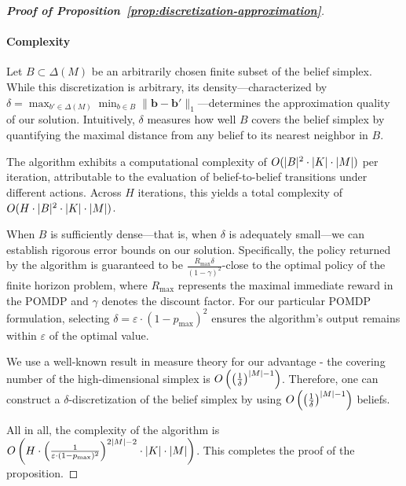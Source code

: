 \begin{proof}[\normalfont\bfseries Proof of Proposition~\ref{prop:discretization-approximation}]
    
    
  \paragraph{Complexity} Let $B \subset \Delta(M)$ be an arbitrarily chosen finite subset of the belief simplex. While this discretization is arbitrary, its density—characterized by $\delta = \max_{b' \in \Delta(M)} \min_{b \in B} \|\bm{b} - \bm{b}'\|_1$—determines the approximation quality of our solution. Intuitively, $\delta$ measures how well $B$ covers the belief simplex by quantifying the maximal distance from any belief to its nearest neighbor in $B$.

  The algorithm exhibits a computational complexity of $O(\lvert B\rvert^2 \cdot \lvert K\rvert \cdot \lvert M\rvert)$ per iteration, attributable to the evaluation of belief-to-belief transitions under different actions. Across $H$ iterations, this yields a total complexity of $O(H \cdot \lvert B\rvert^2 \cdot \lvert K\rvert \cdot \lvert M\rvert)$.

  When $B$ is sufficiently dense—that is, when $\delta$ is adequately small—we can establish rigorous error bounds on our solution. Specifically, the policy returned by the algorithm is guaranteed to be $\frac{R_{\max} \delta}{(1 - \gamma)^2}$-close to the optimal policy of the finite horizon problem, where $R_{\max}$ represents the maximal immediate reward in the POMDP and $\gamma$ denotes the discount factor. For our particular POMDP formulation, selecting $\delta = \varepsilon \cdot (1 - p_{\max})^2$ ensures the algorithm's output remains within $\varepsilon$ of the optimal value.

  We use a well-known result in measure theory for our advantage - the covering number of the high-dimensional simplex is $O\left( \left( \frac{1}{\delta} \right)^{\lvert M\rvert - 1} \right)$. Therefore, one can construct a $\delta$-discretization of the belief simplex by using $O\left( \left( \frac{1}{\delta} \right)^{\lvert M\rvert - 1} \right)$ beliefs.
  
  All in all, the complexity of the algorithm is $O\left( H \cdot \left( \frac{1}{\varepsilon \cdot (1 - p_{\max})^2} \right)^{2\lvert M\rvert - 2} \cdot \lvert K\rvert \cdot \lvert M\rvert \right)$.
This completes the proof of the proposition.
\end{proof}



